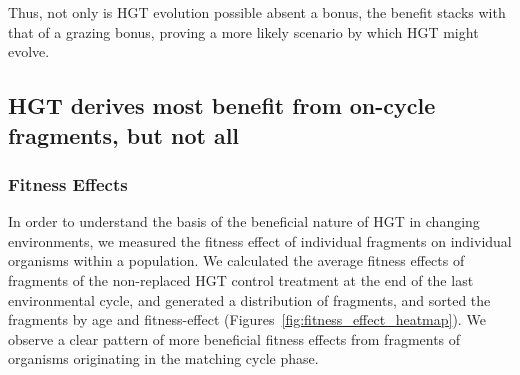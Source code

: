 \documentclass[letterpaper]{article}
\begin{document}
Thus, not only is HGT evolution possible absent a bonus, the benefit stacks with that of a grazing bonus, proving a more likely scenario by which HGT might evolve. %


\subsection{HGT derives most benefit from on-cycle fragments, but not all}
\subsubsection{Fitness Effects}
In order to understand the basis of the beneficial nature of HGT in changing environments, we measured the fitness effect of individual fragments on individual organisms within a population.
We calculated the average fitness effects of fragments of the non-replaced HGT control treatment at the end of the last environmental cycle, and generated a distribution of fragments, and sorted the fragments by age and fitness-effect (Figures~\ref{fig:fitness_effect_heatmap}). We observe a clear pattern of more beneficial fitness effects from fragments of organisms originating in the matching cycle phase. 
\end{document}
